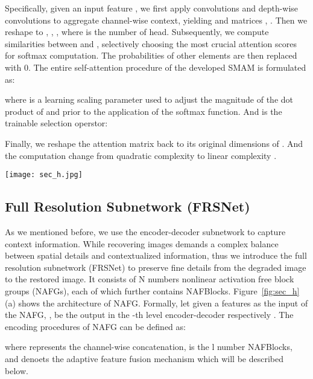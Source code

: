 \documentclass[lettersize,journal]{IEEEtran}
\begin{document}
Specifically, given an input feature , we first apply  convolutions and   depth-wise convolutions to aggregate channel-wise context, yielding  and  matrices , . Then we reshape  to , , , where  is the number of head.
Subsequently, we compute similarities between  and , selectively choosing the most crucial attention scores for softmax computation. The probabilities of other elements are then replaced with 0. The entire self-attention procedure of the developed SMAM is formulated as:

where  is a learning scaling parameter used to adjust the magnitude of the dot product of  and  prior to the application of the softmax function. And  is the trainable selection operstor:


Finally, we reshape the attention matrix back to its original dimensions of .  And the computation change from  quadratic complexity  to  linear complexity .



\begin{figure*}[!htb] \centering
	\texttt{[image: sec\_h.jpg]}
	\caption{(a) The  architecture of nonlinear activation free block groups (NAFG). Each NAFG further contains multiple nonlinear activation free blocks (NAFBlocks). (b) Adaptive feature fusion mechanism (AFFM) between an encoder-decoder subnetwork and FRSNet.}
	\label{fig:sec_h}
\end{figure*}
\subsection{Full Resolution Subnetwork (FRSNet)}
As we mentioned before, we use the encoder-decoder subnetwork to capture context information. While recovering images demands a complex balance between spatial details and  contextualized information, thus we introduce the full resolution subnetwork (FRSNet)  to preserve fine details from the degraded image to the restored image.  It consists of N numbers nonlinear activation free block groups (NAFGs), each of which further contains NAFBlocks. Figure~\ref{fig:sec_h}(a) shows the architecture of NAFG.  Formally, let given a features   as the input of the  NAFG, ,  be the output in the -th level encoder-decoder respectively . The encoding procedures of NAFG can be defined as:  

where  represents the channel-wise concatenation,  is the l number NAFBlocks, and  denoets the adaptive feature fusion mechanism which will be described below.
\end{document}
